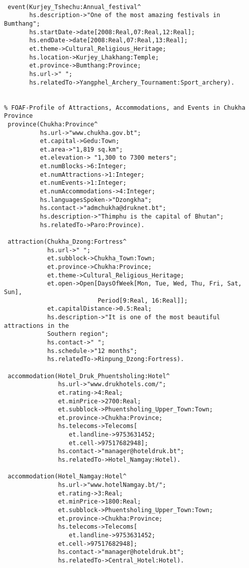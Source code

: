 \begin{verbatim}
           
 event(Kurjey_Tshechu:Annual_festival^
       hs.description->"One of the most amazing festivals in Bumthang";
       hs.startDate->date[2008:Real,07:Real,12:Real];
       hs.endDate->date[2008:Real,07:Real,13:Real];
       et.theme->Cultural_Religious_Heritage;
       hs.location->Kurjey_Lhakhang:Temple;
       et.province->Bumthang:Province;
       hs.url->" ";
       hs.relatedTo->Yangphel_Archery_Tournament:Sport_archery).                     
 
 
% FOAF-Profile of Attractions, Accommodations, and Events in Chukha Province
 province(Chukha:Province^
          hs.url->"www.chukha.gov.bt";
          et.capital->Gedu:Town;
          et.area->"1,819 sq.km";
          et.elevation-> "1,300 to 7300 meters";
          et.numBlocks->6:Integer;
          et.numAttractions->1:Integer;
          et.numEvents->1:Integer;
          et.numAccommodations->4:Integer;
          hs.languagesSpoken->"Dzongkha";
          hs.contact->"admchukha@druknet.bt";
          hs.description->"Thimphu is the capital of Bhutan";
          hs.relatedTo->Paro:Province).

 attraction(Chukha_Dzong:Fortress^
            hs.url->" ";
            et.subblock->Chukha_Town:Town;
            et.province->Chukha:Province;
            et.theme->Cultural_Religious_Heritage;
            et.open->Open[DaysOfWeek[Mon, Tue, Wed, Thu, Fri, Sat, Sun],
                          Period[9:Real, 16:Real]];
            et.capitalDistance->0.5:Real;
            hs.description->"It is one of the most beautiful attractions in the 
            Southern region";
            hs.contact->" ";
            hs.schedule->"12 months";
            hs.relatedTo->Rinpung_Dzong:Fortress).

 accommodation(Hotel_Druk_Phuentsholing:Hotel^
               hs.url->"www.drukhotels.com/";
               et.rating->4:Real;
               et.minPrice->2700:Real;
               et.subblock->Phuentsholing_Upper_Town:Town;
               et.province->Chukha:Province;
               hs.telecoms->Telecoms[
                  et.landline->9753631452;
                  et.cell->97517682948];
               hs.contact->"manager@hoteldruk.bt";
               hs.relatedTo->Hotel_Namgay:Hotel).

 accommodation(Hotel_Namgay:Hotel^
               hs.url->"www.hotelNamgay.bt/";
               et.rating->3:Real;
               et.minPrice->1800:Real;
               et.subblock->Phuentsholing_Upper_Town:Town;
               et.province->Chukha:Province;
               hs.telecoms->Telecoms[
                  et.landline->9753631452;
               et.cell->97517682948];
               hs.contact->"manager@hoteldruk.bt";
               hs.relatedTo->Central_Hotel:Hotel).
                  

\end{verbatim}
